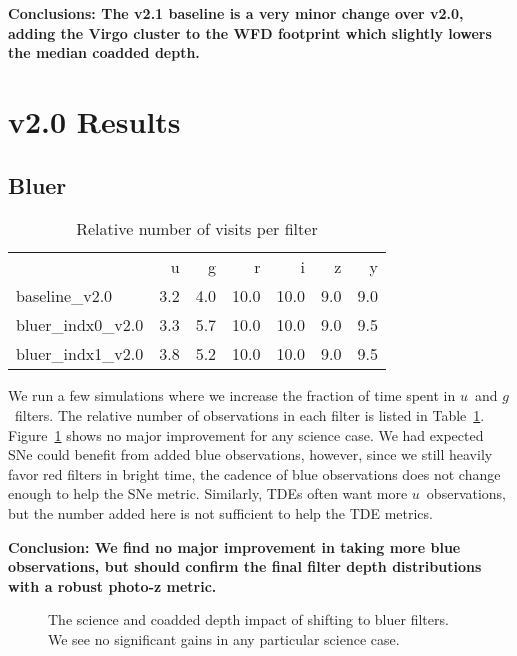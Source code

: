 {\bf Conclusions: The v2.1 baseline is a very minor change over v2.0, adding the Virgo cluster to the WFD footprint which slightly lowers the median coadded depth.}

\section{v2.0 Results}



\subsection{Bluer}

\begin{table}
\caption{Relative number of visits per filter}
\begin{tabular}{lrrrrrr}
\toprule
{} &   u &   g &    r &    i &   z &   y \\
baseline\_v2.0    & 3.2 & 4.0 & 10.0 & 10.0 & 9.0 & 9.0 \\
bluer\_indx0\_v2.0 & 3.3 & 5.7 & 10.0 & 10.0 & 9.0 & 9.5 \\
bluer\_indx1\_v2.0 & 3.8 & 5.2 & 10.0 & 10.0 & 9.0 & 9.5 \\
\end{tabular}
\label{table:blue}
\end{table}

We run a few simulations where we increase the fraction of time spent in $u$\ and $g$\ filters. The relative number of observations in each filter is listed in Table~\ref{table:blue}. Figure~\ref{fig:bluer_radar} shows no major improvement for any science case. We had expected SNe could benefit from added blue observations, however, since we still heavily favor red filters in bright time, the cadence of blue observations does not change enough to help the SNe metric. Similarly, TDEs often want more $u$\ observations, but the number added here is not sufficient to help the TDE metrics.

{\bf Conclusion:  We find no major improvement in taking more blue observations, but should confirm the final filter depth distributions with a robust photo-z metric.}

\begin{figure}
\caption{The science and coadded depth impact of shifting to bluer filters. We see no significant gains in any particular science case.\label{fig:bluer_radar}}
\end{figure}

